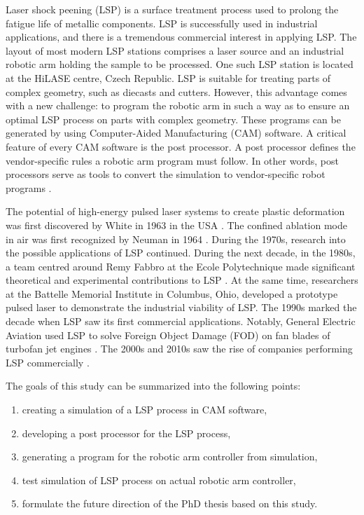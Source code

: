 \label{sec:introduction}

Laser shock peening (LSP) is a surface treatment process used to prolong the fatigue life of metallic components. LSP is successfully used in industrial applications, and there is a tremendous commercial interest in applying LSP. The layout of most modern LSP stations comprises a laser source and an industrial robotic arm holding the sample to be processed. One such LSP station is located at the HiLASE centre, Czech Republic. LSP is suitable for treating parts of complex geometry, such as diecasts and cutters. However, this advantage comes with a new challenge: to program the robotic arm in such a way as to ensure an optimal LSP process on parts with complex geometry. These programs can be generated by using Computer-Aided Manufacturing (CAM) software. A critical feature of every CAM software is the post processor. A post processor defines the vendor-specific rules a robotic arm program must follow.  In other words, post processors serve as tools to convert the simulation to vendor-specific robot programs \cite{ding_ye_2006}.

The potential of high-energy pulsed laser systems to create plastic deformation was first discovered by White in 1963 in the USA \cite{white_1963}. The confined ablation mode in air was first recognized by Neuman in 1964 \cite{neuman_1964}. During the 1970s, research into the possible applications of LSP continued. During the next decade, in the 1980s, a team centred around Remy Fabbro at the Ecole Polytechnique made significant theoretical and experimental contributions to LSP \cite{fabbro_fournier_ballard_devaux_virmont_1990}. At the same time, researchers at the Battelle Memorial Institute in Columbus, Ohio, developed a prototype pulsed laser to demonstrate the industrial viability of LSP. The 1990s marked the decade when LSP saw its first commercial applications. Notably, General Electric Aviation used LSP to solve Foreign Object Damage (FOD) on fan blades of turbofan jet engines \cite{airforce}. The 2000s and 2010s saw the rise of companies performing LSP commercially \cite{sano}.

The goals of this study can be summarized into the following points:
\begin{enumerate}

    \item creating a simulation of a LSP process in CAM software,
    \item developing a post processor for the LSP process, 
    \item generating a program  for the robotic arm controller from simulation,
    \item test simulation of LSP process on actual robotic arm controller,
    \item formulate the future direction of the PhD thesis based on this study.
    
\end{enumerate}

